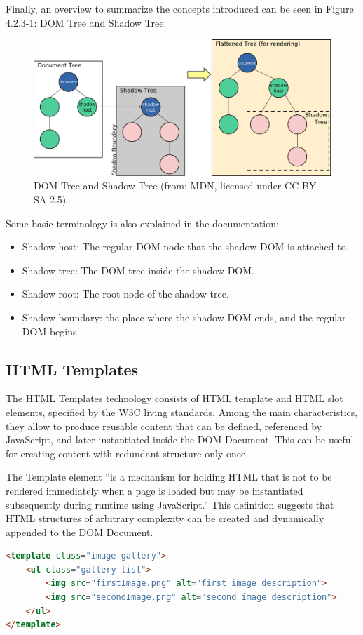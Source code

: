 Finally, an overview to summarize the concepts introduced can be seen in Figure 4.2.3-1: DOM Tree and Shadow Tree.

\begin{figure}[H]
\centering
\includegraphics[width=1\textwidth]{images/shadowdom.jpg}
\caption{DOM Tree and Shadow Tree (from: MDN, licensed under CC-BY-SA 2.5)}
\label{fig:shadowDom}
\end{figure}

Some basic terminology is also explained in the documentation:

\begin{itemize}
\item Shadow host: The regular DOM node that the shadow DOM is attached to.
\item Shadow tree: The DOM tree inside the shadow DOM.
\item Shadow root: The root node of the shadow tree.
\item Shadow boundary: the place where the shadow DOM ends, and the regular DOM begins.
\end{itemize}

\subsection{HTML Templates}
\label{subsec:HTMLTemplates}

The HTML Templates technology consists of HTML template and HTML slot elements, specified by the W3C living standards. Among the main characteristics, they allow to produce reusable content that can be defined, referenced by JavaScript, and later instantiated inside the DOM Document. This can be useful for creating content with redundant structure only once.

The Template element “is a mechanism for holding HTML that is not to be rendered immediately when a page is loaded but may be instantiated subsequently during runtime using JavaScript.” This definition suggests that HTML structures of arbitrary complexity can be created and dynamically appended to the DOM Document.
\\
\begin{lstlisting}[caption={HTML Template creation},label={htmlTemplate}, language=HTML]
<template class="image-gallery">
    <ul class="gallery-list">
        <img src="firstImage.png" alt="first image description">
        <img src="secondImage.png" alt="second image description">
    </ul>
</template>
\end{lstlisting}

